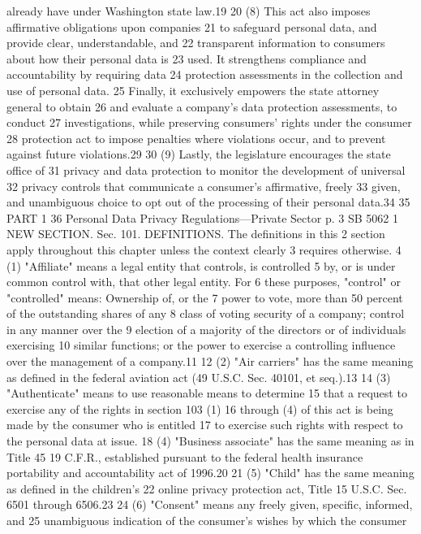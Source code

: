 already have under Washington state law.19
20 (8) This act also imposes affirmative obligations upon companies
21 to safeguard personal data, and provide clear, understandable, and
22 transparent information to consumers about how their personal data is
23 used. It strengthens compliance and accountability by requiring data
24 protection assessments in the collection and use of personal data.
25 Finally, it exclusively empowers the state attorney general to obtain
26 and evaluate a company's data protection assessments, to conduct
27 investigations, while preserving consumers' rights under the consumer
28 protection act to impose penalties where violations occur, and to
prevent against future violations.29
30 (9) Lastly, the legislature encourages the state office of
31 privacy and data protection to monitor the development of universal
32 privacy controls that communicate a consumer's affirmative, freely
33 given, and unambiguous choice to opt out of the processing of their
personal data.34
35 PART 1
36 Personal Data Privacy Regulations—Private Sector
p. 3 SB 5062
1 NEW SECTION. Sec. 101. DEFINITIONS. The definitions in this
2 section apply throughout this chapter unless the context clearly
3 requires otherwise.
4 (1) "Affiliate" means a legal entity that controls, is controlled
5 by, or is under common control with, that other legal entity. For
6 these purposes, "control" or "controlled" means: Ownership of, or the
7 power to vote, more than 50 percent of the outstanding shares of any
8 class of voting security of a company; control in any manner over the
9 election of a majority of the directors or of individuals exercising
10 similar functions; or the power to exercise a controlling influence
over the management of a company.11
12 (2) "Air carriers" has the same meaning as defined in the federal
aviation act (49 U.S.C. Sec. 40101, et seq.).13
14 (3) "Authenticate" means to use reasonable means to determine
15 that a request to exercise any of the rights in section 103 (1)
16 through (4) of this act is being made by the consumer who is entitled
17 to exercise such rights with respect to the personal data at issue.
18 (4) "Business associate" has the same meaning as in Title 45
19 C.F.R., established pursuant to the federal health insurance
portability and accountability act of 1996.20
21 (5) "Child" has the same meaning as defined in the children's
22 online privacy protection act, Title 15 U.S.C. Sec. 6501 through
6506.23
24 (6) "Consent" means any freely given, specific, informed, and
25 unambiguous indication of the consumer's wishes by which the consumer
